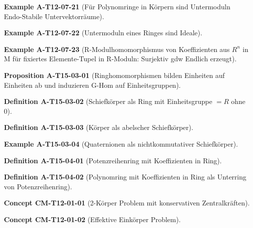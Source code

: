 \documentclass[10pt, letterpaper]{article}
\newcommand{\CustomHeading}[3]{%
  \par\medskip\noindent%
  \textbf{#1 #2} \textnormal{(#3)}.\enskip%
}
\newenvironment{DEF}[2]{\CustomHeading{Definition}{#1}{#2}}{}
\newenvironment{PROP}[2]{\CustomHeading{Proposition}{#1}{#2}}{}
\newenvironment{EXA}[2]{\CustomHeading{Example}{#1}{#2}}{}
\newenvironment{CONC}[2]{\CustomHeading{Concept}{#1}{#2}}{}
\begin{document}
\begin{EXA}{A-T12-07-21}{Für Polynomringe in Körpern sind Untermoduln Endo-Stabile Untervektorräume}
\end{EXA}

\begin{EXA}{A-T12-07-22}{Untermoduln eines Ringes sind Ideale}
\end{EXA}

\begin{EXA}{A-T12-07-23}{R-Modulhomomorphismus von Koeffizienten aus $R^n$ in M für fixiertes Elemente-Tupel in R-Moduln: Surjektiv gdw Endlich erzeugt}
\end{EXA}

\begin{PROP}{A-T15-03-01}{Ringhomomorphismen bilden Einheiten auf Einheiten ab und induzieren G-Hom auf Einheitsgruppen}
\end{PROP}

\begin{DEF}{A-T15-03-02}{Schiefkörper als Ring mit Einheitsgruppe $= R$ ohne $0$}
\end{DEF}

\begin{DEF}{A-T15-03-03}{Körper als abelscher Schiefkörper}
\end{DEF}

\begin{EXA}{A-T15-03-04}{Quaternionen als nichtkommutativer Schiefkörper}
\end{EXA}

\begin{DEF}{A-T15-04-01}{Potenzreihenring mit Koeffizienten in Ring}
\end{DEF}

\begin{DEF}{A-T15-04-02}{Polynomring mit Koeffizienten in Ring als Unterring von Potenzreihenring}
\end{DEF}

\begin{CONC}{CM-T12-01-01}{2-Körper Problem mit konservativen Zentralkräften}
\end{CONC}

\begin{CONC}{CM-T12-01-02}{Effektive Einkörper Problem}
\end{CONC}
\end{document}
